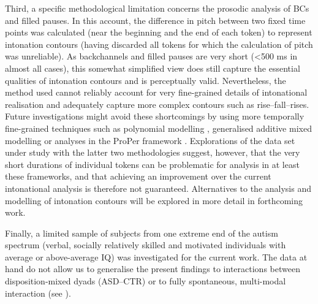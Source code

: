 Third, a specific methodological limitation concerns the prosodic analysis of BCs and filled pauses. In this account, the difference in pitch between two fixed time points was calculated (near the beginning and the end of each token) to represent intonation contours (having discarded all tokens for which the calculation of pitch was unreliable). As backchannels and filled pauses are very short (<500 ms in almost all cases), this somewhat simplified view does still capture the essential qualities of intonation contours and is perceptually valid. Nevertheless, the method used cannot reliably account for very fine-grained details of intonational realisation and adequately capture more complex contours such as rise--fall--rises. Future investigations might avoid these shortcomings by using more temporally fine-grained techniques such as polynomial modelling \citep{belzPitchCharacteristicsFilled2015}, generalised additive mixed modelling \citep{soskuthyEvaluatingGeneralisedAdditive2021} or analyses in the ProPer framework \citep{albertUsingPeriodicEnergy2018,albertModelSonorityBased2023,albertProPerPROsodicAnalysis2020,cangemiModellingIntonationSegments2019}. Explorations of the data set under study with the latter two methodologies suggest, however, that the very short durations of individual tokens can be problematic for analysis in at least these frameworks, and that achieving an improvement over the current intonational analysis is therefore not guaranteed. Alternatives to the analysis and modelling of intonation contours will be explored in more detail in forthcoming work. 

 Finally, a limited sample of subjects from one extreme end of the autism spectrum (verbal, socially relatively skilled and motivated individuals with average or above-average IQ) was investigated for the current work. The data at hand do not allow us to generalise the present findings to interactions between disposition-mixed dyads (ASD--CTR) or to fully spontaneous, multi-modal interaction (see ).


